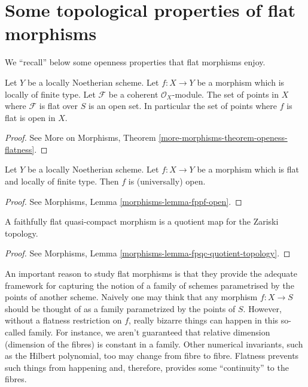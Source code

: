 \section{Some topological properties of flat morphisms}
\label{section-topological-flat}

\noindent
We ``recall'' below some openness properties that flat morphisms enjoy.

\begin{theorem}
\label{theorem-flat-open}
Let $Y$ be a locally Noetherian scheme.
Let $f : X \to Y$ be a morphism which is locally of finite type.
Let $\mathcal{F}$ be a coherent $\mathcal{O}_X$-module.
The set of points in $X$ where $\mathcal{F}$ is flat over $S$ is an open set.
In particular the set of points where $f$ is flat is open in $X$.
\end{theorem}

\begin{proof}
See More on Morphisms, Theorem \ref{more-morphisms-theorem-openess-flatness}.
\end{proof}

\begin{theorem}
\label{theorem-flat-map-open}
Let $Y$ be a locally Noetherian scheme.
Let $f : X \to Y$ be a morphism which is flat and locally of finite type.
Then $f$ is (universally) open.
\end{theorem}

\begin{proof}
See Morphisms, Lemma \ref{morphisms-lemma-fppf-open}.
\end{proof}

\begin{theorem}
\label{theorem-flat-is-quotient}
A faithfully flat quasi-compact morphism is a quotient map for
the Zariski topology.
\end{theorem}

\begin{proof}
See Morphisms, Lemma \ref{morphisms-lemma-fpqc-quotient-topology}.
\end{proof}

\noindent
An important reason to study flat morphisms is that they provide the adequate
framework for capturing the notion of a family of schemes parametrised by the
points of another scheme. Naively one may think that any morphism $f : X \to S$
should be thought of as a family parametrized by the points of $S$. However,
without a flatness restriction on $f$, really bizarre things can happen in
this so-called family. For instance, we aren't guaranteed that relative
dimension (dimension of the fibres) is constant in a family. Other numerical
invariants, such as the Hilbert polynomial, too may change from fibre to
fibre. Flatness prevents such things from happening and, therefore, provides
some ``continuity'' to the fibres.


